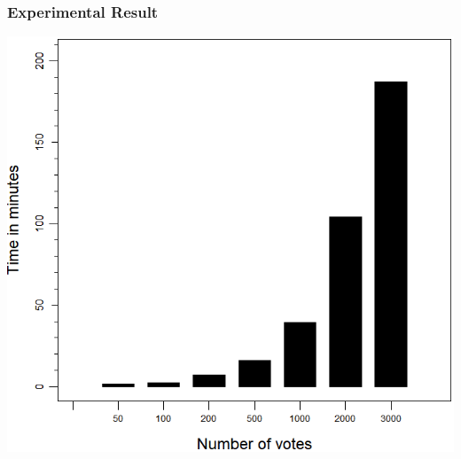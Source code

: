 \documentclass{beamer}
\begin{document}
\begin{frame}
\frametitle{Experimental Result}
{\includegraphics[scale=0.40]{PlotVer3.png}}
\end{frame}



%

%
%
\end{document}

